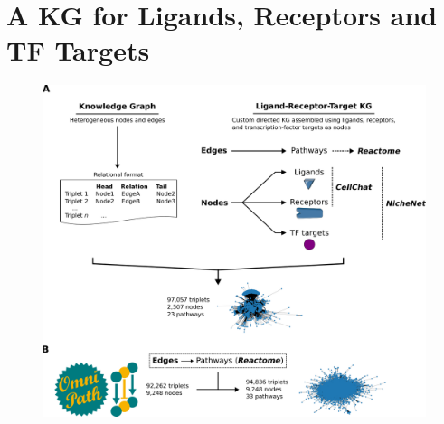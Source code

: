


\section{A KG for Ligands, Receptors and TF Targets}

\begin{figure}
    \centering
    \includegraphics{06kg/figs/6KG_kg.png}
    \caption{}
    \label{fig:6kg}
\end{figure}

